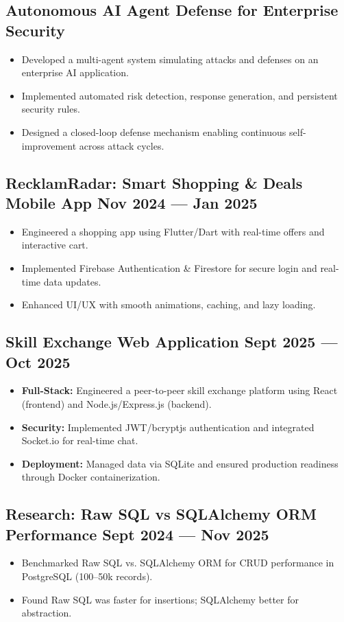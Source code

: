 \documentclass[11pt, a4paper]{article}
\begin{document}
\subsection*{Autonomous AI Agent Defense for Enterprise Security}
\begin{itemize}
    \item Developed a multi-agent system simulating attacks and defenses on an enterprise AI application.
    \item Implemented automated risk detection, response generation, and persistent security rules.
    \item Designed a closed-loop defense mechanism enabling continuous self-improvement across attack cycles.
\end{itemize}

\subsection*{RecklamRadar: Smart Shopping \& Deals Mobile App \hfill Nov 2024 --- Jan 2025}
\begin{itemize}
    \item Engineered a shopping app using Flutter/Dart with real-time offers and interactive cart.
    \item Implemented Firebase Authentication \& Firestore for secure login and real-time data updates.
    \item Enhanced UI/UX with smooth animations, caching, and lazy loading.
\end{itemize}

\subsection*{Skill Exchange Web Application \hfill Sept 2025 --- Oct 2025}
\begin{itemize}
    \item \textbf{Full-Stack:} Engineered a peer-to-peer skill exchange platform using React (frontend) and Node.js/Express.js (backend).
    \item \textbf{Security:} Implemented JWT/bcryptjs authentication and integrated Socket.io for real-time chat.
    \item \textbf{Deployment:} Managed data via SQLite and ensured production readiness through Docker containerization.
\end{itemize}

\subsection*{Research: Raw SQL vs SQLAlchemy ORM Performance \hfill Sept 2024 --- Nov 2025}
\begin{itemize}
    \item Benchmarked Raw SQL vs. SQLAlchemy ORM for CRUD performance in PostgreSQL (100–50k records).
    \item Found Raw SQL was faster for insertions; SQLAlchemy better for abstraction.
\end{itemize}
\end{document}
